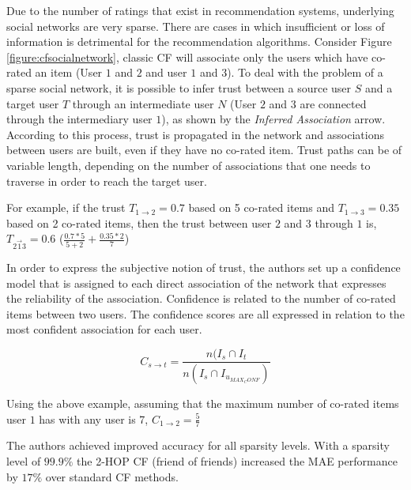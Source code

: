 Due to the number of ratings that exist in recommendation systems, underlying
social networks are very sparse. There are cases in which insufficient or loss
of information is detrimental for the recommendation algorithms. Consider
Figure \ref{figure:cfsocialnetwork}, classic CF will associate only the users
which have co-rated an item (User $1$ and $2$ and user $1$ and $3$). To deal
with the problem of a sparse social network, it is possible to infer trust
between a source user $S$ and a target user $T$ through an intermediate user
$N$ (User $2$ and $3$ are connected through the intermediary user $1$), as
shown by the \emph{Inferred Association} arrow. According to this process,
trust is propagated in the network and associations between users are built,
even if they have no co-rated item. Trust paths can be of variable length,
depending on the number of associations that one needs to traverse in order to
reach the target user.

For example, if the trust $T_{1 \rightarrow 2} = 0.7$ based on 5 co-rated items
and $T_{1 \rightarrow 3} = 0.35$ based on 2 co-rated items, then the trust
between user $2$ and $3$ through $1$ is, $T_{2 \overrightarrow{1} 3} = 0.6$
($\frac{0.7*5}{5+2} + \frac{0.35*2}{7}$)

In order to express the subjective notion of trust, the authors set up a
confidence model that is assigned to each direct association of the network
that expresses the reliability of the association. Confidence is related to the
number of co-rated items between two users. The confidence scores are all
expressed in relation to the most confident association for each user.

\begin{equation}
C_{s \rightarrow t} = \frac{n(I_{s} \cap I_{t}}{n(I_{s} \cap I_{u_{MAX_CONF}})} 
\end{equation}

Using the above example, assuming that the maximum number of co-rated items
user $1$ has with any user is 7, $C_{1 \rightarrow 2} = \frac{5}{7}$

The authors achieved improved accuracy for all sparsity levels. With a sparsity
level of $99.9\%$ the 2-HOP CF (friend of friends) increased the MAE
performance by $17\%$ over standard CF methods.




